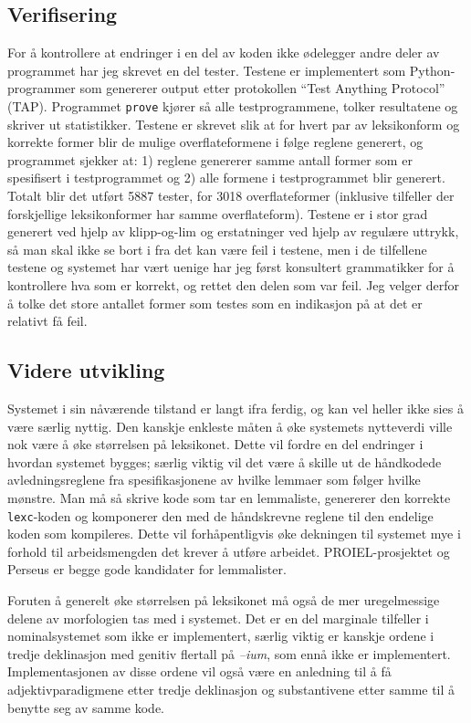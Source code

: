 \documentclass{article}
\let\prog\texttt
\let\w\emph
\begin{document}
\subsection{Verifisering}
For \aa{} kontrollere at endringer i en del av koden ikke \o{}delegger andre
deler av programmet har jeg skrevet en del tester. Testene er implementert som
Python-programmer som genererer output etter protokollen ``Test Anything
Protocol'' (TAP). Programmet \prog{prove} kj\o{}rer s\aa{} alle
testprogrammene, tolker resultatene og skriver ut statistikker. Testene er
skrevet slik at for hvert par av leksikonform og korrekte former blir de
mulige overflateformene i f\o{}lge reglene generert, og programmet sjekker at:
1) reglene genererer samme antall former som er spesifisert i testprogrammet
og 2) alle formene i testprogrammet blir generert. Totalt blir det utf\o{}rt
5887 tester, for 3018 overflateformer (inklusive tilfeller der forskjellige
leksikonformer har samme overflateform). Testene er i stor grad generert ved
hjelp av klipp-og-lim og erstatninger ved hjelp av regul\ae{}re uttrykk,
s\aa{} man skal ikke se bort i fra det kan v\ae{}re feil i testene, men i de
tilfellene testene og systemet har v\ae{}rt uenige har jeg f\o{}rst konsultert
grammatikker for \aa{} kontrollere hva som er korrekt, og rettet den delen som
var feil. Jeg velger derfor \aa{} tolke det store antallet former som testes
som en indikasjon p\aa{} at det er relativt f\aa{} feil.

\subsection{Videre utvikling}
Systemet i sin n\aa{}v\ae{}rende tilstand er langt ifra ferdig, og kan vel
heller ikke sies \aa{} v\ae{}re s\ae{}rlig nyttig. Den kanskje enkleste
m\aa{}ten \aa{} \o{}ke systemets nytteverdi ville nok v\ae{}re \aa{} \o{}ke
st\o{}rrelsen p\aa{} leksikonet. Dette vil fordre en del endringer i hvordan
systemet bygges; s\ae{}rlig viktig vil det v\ae{}re \aa{} skille ut de
h\aa{}ndkodede avledningsreglene fra spesifikasjonene av hvilke lemmaer som
f\o{}lger hvilke m\o{}nstre. Man m\aa{} s\aa{} skrive kode som tar en
lemmaliste, genererer den korrekte \prog{lexc}-koden og komponerer den med de
h\aa{}ndskrevne reglene til den endelige koden som kompileres. Dette vil
forh\aa{}pentligvis \o{}ke dekningen til systemet mye i forhold til
arbeidsmengden det krever \aa{} utf\o{}re arbeidet. PROIEL-prosjektet og
Perseus er begge gode kandidater for lemmalister.

Foruten \aa{} generelt \o{}ke st\o{}rrelsen p\aa{} leksikonet m\aa{} ogs\aa{}
de mer uregelmessige delene av morfologien tas med i systemet. Det er en del
marginale tilfeller i nominalsystemet som ikke er implementert, s\ae{}rlig
viktig er kanskje ordene i tredje deklinasjon med genitiv flertall p\aa{}
\w{--ium}, som enn\aa{} ikke er implementert. Implementasjonen av disse ordene
vil ogs\aa{} v\ae{}re en anledning til \aa{} f\aa{} adjektivparadigmene etter
tredje deklinasjon og substantivene etter samme til \aa{} benytte seg av samme
kode.
\end{document}
